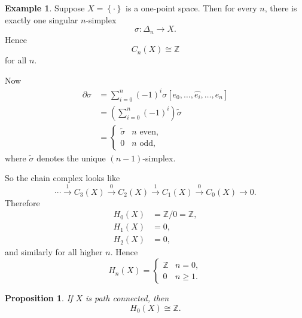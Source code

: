\documentclass[11pt,a4paper]{article}
\theoremstyle{definition}
\newtheorem{example}[definition]{Example}
\theoremstyle{plain}
\newtheorem{proposition}[definition]{Proposition}
\theoremstyle{remark}
\renewcommand{\set}[1]{\left\{ #1 \right\}}
\newcommand{\1}{\mathbbm{1}}
\begin{document}
\begin{example}
    Suppose $X=\set{\cdot}$ is a one-point space. Then for every $n$, there is exactly one singular $n$-simplex
    \[
    \sigma \colon \Delta_n \to X.
    \]
    Hence
    \[
    C_n(X) \cong \mathbb{Z}
    \]
    for all $n$.

    Now
    \begin{align*}
        \partial \sigma
        &= \sum_{i=0}^n (-1)^i \sigma[e_0,\dots,\hat{e_i},\dots,e_n] \\
        &= \left(\sum_{i=0}^n (-1)^i\right)\tilde{\sigma} \\
        &=
        \begin{cases}
            \tilde{\sigma} & n \text{ even},\\
            0 & n \text{ odd},
        \end{cases}
    \end{align*}
    where $\tilde{\sigma}$ denotes the unique $(n-1)$-simplex.

    So the chain complex looks like
    \[
    \cdots \xrightarrow{1} C_3(X) \xrightarrow{0} C_2(X) \xrightarrow{1} C_1(X) \xrightarrow{0} C_0(X) \to 0.
    \]
    Therefore
    \begin{align*}
        H_0(X) &= \mathbb{Z}/0 = \mathbb{Z}, \\
        H_1(X) &= 0, \\
        H_2(X) &= 0,
    \end{align*}
    and similarly for all higher $n$. Hence
    \[
    H_n(X) =
    \begin{cases}
        \mathbb{Z} & n=0,\\
        0 & n\ge 1.
    \end{cases}
    \]
\end{example}

\begin{proposition}
    If $X$ is path connected, then
    \[
    H_0(X) \cong \mathbb{Z}.
    \]
\end{proposition}
\end{document}
